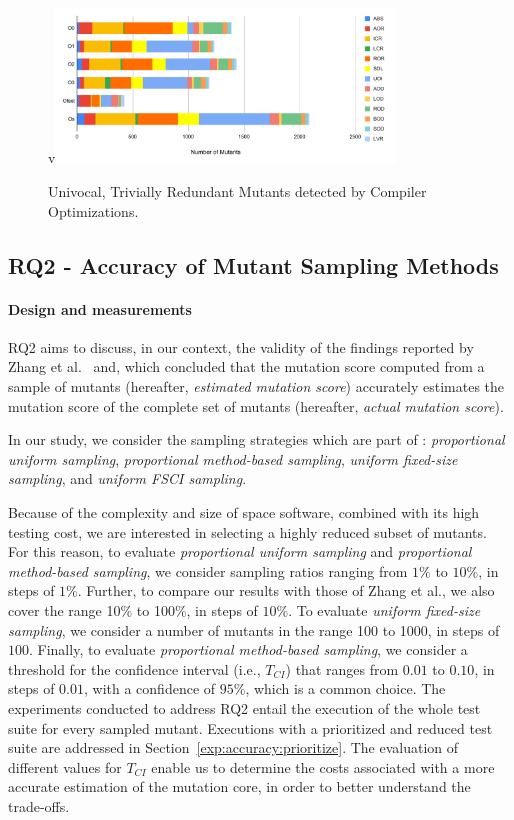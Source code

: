 \begin{figure}[tb]
\begin{center}
v\includegraphics[width=9cm]{images/univ-red}
\caption{Univocal, Trivially Redundant Mutants detected by Compiler Optimizations.}
\label{fig:results:univred}
\end{center}
\end{figure}

\subsection{RQ2 - Accuracy of Mutant Sampling Methods}

\paragraph{Design and measurements}


RQ2 aims to discuss, in our context, the validity of the findings reported by Zhang et al.~\cite{zhang2013operator} and, which concluded that the mutation score  computed from a sample of mutants (hereafter, \emph{estimated mutation score}) accurately estimates the mutation score of the complete set of mutants (hereafter, \emph{actual mutation score}).

In our study, we consider the sampling strategies which are part of \APPR: \emph{proportional uniform sampling}, \emph{proportional method-based sampling},  \emph{uniform fixed-size sampling}, and \emph{uniform FSCI sampling}. 


Because of the complexity and size of space software, combined with its high testing cost, we are interested in selecting a highly reduced subset of mutants. 
For this reason, 
to evaluate  \emph{proportional uniform sampling} and \emph{proportional method-based sampling},
we consider sampling ratios ranging from $1\%$ to $10\%$, in steps of $1\%$. Further, to compare our results with those of Zhang et al., we also cover the range 10\% to 100\%, in steps of $10\%$. To evaluate  \emph{uniform fixed-size sampling}, we consider a number of mutants in the range 100 to 1000, in steps of $100$.
Finally, to evaluate \emph{proportional method-based sampling}, we consider a threshold for the confidence interval (i.e., $T_{\mathit{CI}}$) that ranges from $0.01$ to $0.10$, in steps of $0.01$, with a confidence of $95\%$, which is a common choice. The experiments conducted to address RQ2 entail the execution of the whole test suite for every sampled mutant. Executions with a prioritized and reduced test suite are addressed in Section~\ref{exp:accuracy:prioritize}. The evaluation of different values for $T_{\mathit{CI}}$ enable us to determine the costs associated with a more accurate estimation of the mutation core, in order to better understand the trade-offs.



